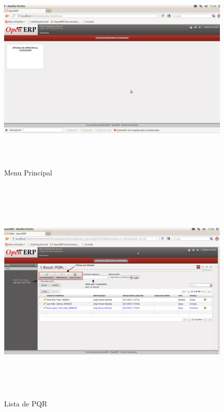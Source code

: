 \begin{figure}
 \centering
 \includegraphics[width=15cm,height=10cm]{./Imagenes/menumain.png}
 \caption{Menu Principal}
 \label{fig:menumain}
\end{figure}

\begin{figure}
 \centering
 \includegraphics[width=16cm,height=11cm]{./Imagenes/menulista.png}
 \caption{Lista de PQR}
 \label{fig:menulista}
\end{figure}

